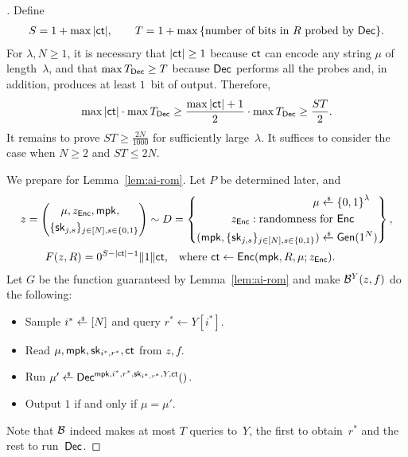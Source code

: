\begin{proof}[]
Define
\begin{align*}
S=1+\max{|\ct|},\qquad
T=1+\max{\{\textup{number of bits in $R$ probed by $\Dec$}\}}.
\end{align*}
For ${\lambda,N\geq 1}$, it is necessary
that ${|\ct|\geq 1}$ because $\ct$ can encode any string $\mu$ of length~$\lambda$, and
that ${\max{\TDec}\geq T}$ because $\Dec$ performs all the probes and, in addition, produces at least $1$~bit of output.
Therefore,
\begin{align*}
\max{|\ct|}\cdot\max{\TDec}
\geq\frac{\max{|\ct|}+1}{2}\cdot\max{\TDec}
\geq\frac{ST}{2}.
\end{align*}
It remains to prove ${ST\geq\frac{2N}{1000}}$ for sufficiently large~$\lambda$.
It suffices to consider the case when ${N\geq 2}$ and ${ST\leq 2N}$.

We prepare for Lemma~\ref{lem:ai-rom}.
Let $P$ be determined later, and
\begin{align*}
z&{}=\left(\begin{aligned}
&\quad\WideNarrow{}{\ \,}\mu,z_\Enc,\mpk,\\
&\{\sk_{j,s}\}_{j\in[N],s\in\bit}
\end{aligned}\right)\sim D=
\left\{\begin{aligned}
\mu\draws{}&\bit^\lambda\\
z_\Enc:\textup{randomness for }&\Enc\\
(\mpk,\{\sk_{j,s}\}_{j\in[N],s\in\bit})\draws{}&\Gen(1^N)
\end{aligned}\right\},\\
\rule[1em]{0pt}{0pt}
F(z,R)
\hspace*{-5em}&\hspace*{5em}
{}=0^{S-|\ct|-1}\concat 1\concat\ct\textup{,\quad where }
\ct\gets\Enc(\mpk,R,\mu;z_\Enc).
\end{align*}
Let $G$ be the function guaranteed by Lemma~\ref{lem:ai-rom} and make
${\mathcal{B}}^Y(z,f)$ do the following:
\begin{itemize}
\item Sample ${i^\ast\draws[N]}$ and query ${r^\ast\gets Y[i^\ast]}$.
\item Read $\mu,\mpk,\sk_{i^\ast,r^\ast},\ct$ from $z,f$.
\item Run ${\mu'\draws\Dec^{\mpk,i^\ast,r^\ast,\sk_{i^\ast,r^\ast},Y,\ct}()}$.
\item Output $1$ if and only if ${\mu=\mu'}$.
\end{itemize}
Note that ${\mathcal{B}}$ indeed makes at most $T$ queries to~$Y$,
the first to obtain~$r^\ast$ and the rest to run~$\Dec$.


\end{proof}
